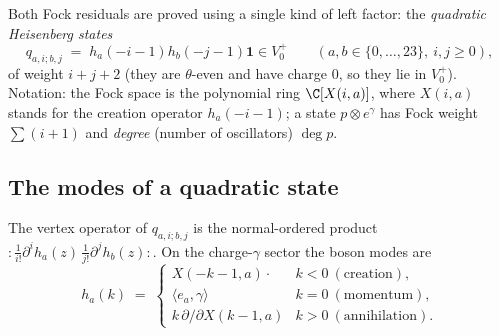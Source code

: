 Both Fock residuals are proved using a single kind of left factor: the \emph{quadratic Heisenberg
states}
\begin{equation*}
  q_{a,i;b,j} \;=\; h_a(-i-1)h_b(-j-1)\mathbf 1 \in V_0^+\qquad (a,b\in\{0,\dots,23\},\ i,j\ge0),
\end{equation*}
of weight $i+j+2$ (they are $\theta$-even and have charge $0$, so they lie in $V_0^+$).  Notation: the
Fock space is the polynomial ring $\C[X(i,a)]$, where $X(i,a)$ stands for the creation operator
$h_a(-i-1)$; a state $p\otimes e^\gamma$ has Fock weight $\sum(i+1)$ and \emph{degree} (number of
oscillators) $\deg p$.

\subsection{The modes of a quadratic state}

The vertex operator of $q_{a,i;b,j}$ is the normal-ordered product
$:\!\tfrac{1}{i!}\partial^ih_a(z)\,\tfrac1{j!}\partial^jh_b(z)\!:$.  On the charge-$\gamma$ sector the
boson modes are
\begin{equation*}
  h_a(k)\;=\;\begin{cases} X(-k-1,a)\cdot & k<0 \ (\text{creation}),\\
  \langle e_a,\gamma\rangle & k=0\ (\text{momentum}),\\
  k\,\partial/\partial X(k-1,a) & k>0\ (\text{annihilation}).\end{cases}
\end{equation*}

